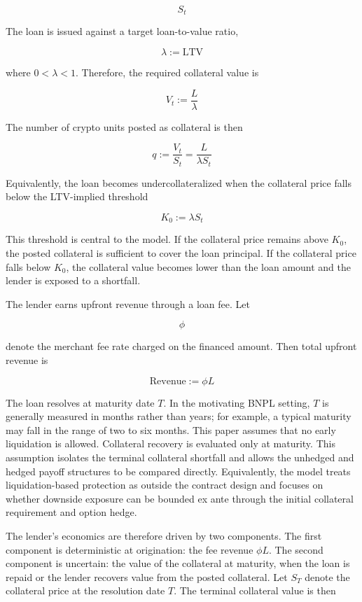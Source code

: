 \documentclass[11pt]{article}
\begin{document}
$$
S_t
$$

The loan is issued against a target loan-to-value ratio,

$$
\lambda := \text{LTV}
$$

where $0 < \lambda < 1$. Therefore, the required collateral value is

$$
V_t := \frac{L}{\lambda}
$$

The number of crypto units posted as collateral is then

$$
q := \frac{V_t}{S_t} = \frac{L}{\lambda S_t}
$$

Equivalently, the loan becomes undercollateralized when the collateral price falls below the LTV-implied threshold

$$
K_0 := \lambda S_t
$$

This threshold is central to the model. If the collateral price remains above $K_0$, the posted collateral is sufficient to cover the loan principal. If the collateral price falls below $K_0$, the collateral value becomes lower than the loan amount and the lender is exposed to a shortfall.

The lender earns upfront revenue through a loan fee. Let

$$
\phi
$$

denote the merchant fee rate charged on the financed amount. Then total upfront revenue is

$$
\text{Revenue} := \phi L
$$

The loan resolves at maturity date $T$. In the motivating BNPL setting, $T$ is generally measured in months rather than years; for example, a typical maturity may fall in the range of two to six months. This paper assumes that no early liquidation is allowed. Collateral recovery is evaluated only at maturity. This assumption isolates the terminal collateral shortfall and allows the unhedged and hedged payoff structures to be compared directly. Equivalently, the model treats liquidation-based protection as outside the contract design and focuses on whether downside exposure can be bounded ex ante through the initial collateral requirement and option hedge.

The lender’s economics are therefore driven by two components. The first component is deterministic at origination: the fee revenue $\phi L$. The second component is uncertain: the value of the collateral at maturity, when the loan is repaid or the lender recovers value from the posted collateral. Let $S_T$ denote the collateral price at the resolution date $T$. The terminal collateral value is then
\end{document}
